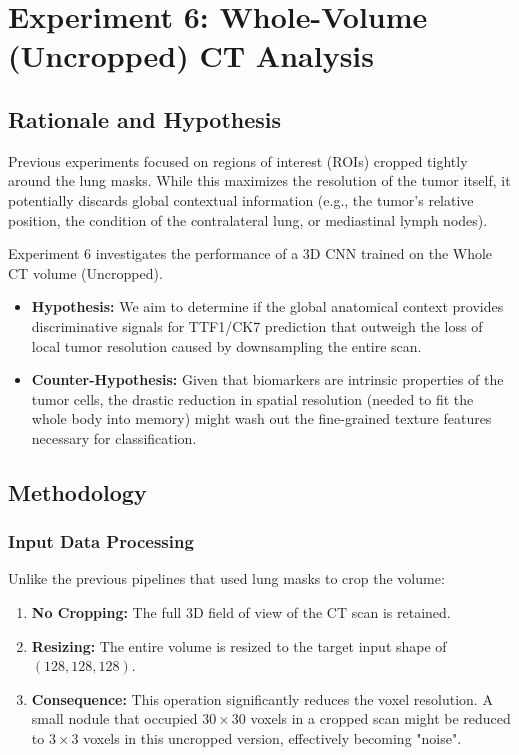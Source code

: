 \section{Experiment 6: Whole-Volume (Uncropped) CT Analysis}

\subsection{Rationale and Hypothesis}
Previous experiments focused on regions of interest (ROIs) cropped tightly around the lung masks. While this maximizes the resolution of the tumor itself, it potentially discards global contextual information (e.g., the tumor's relative position, the condition of the contralateral lung, or mediastinal lymph nodes).

Experiment 6 investigates the performance of a 3D CNN trained on the Whole CT volume (Uncropped). 
\begin{itemize}
    \item \textbf{Hypothesis:} We aim to determine if the global anatomical context provides discriminative signals for TTF1/CK7 prediction that outweigh the loss of local tumor resolution caused by downsampling the entire scan.
    \item \textbf{Counter-Hypothesis:} Given that biomarkers are intrinsic properties of the tumor cells, the drastic reduction in spatial resolution (needed to fit the whole body into memory) might wash out the fine-grained texture features necessary for classification.
\end{itemize}

\subsection{Methodology}

\subsubsection{Input Data Processing}
Unlike the previous pipelines that used lung masks to crop the volume:
\begin{enumerate}
    \item \textbf{No Cropping:} The full 3D field of view of the CT scan is retained.
    \item \textbf{Resizing:} The entire volume is resized to the target input shape of $(128, 128, 128)$. 
    \item \textbf{Consequence:} This operation significantly reduces the voxel resolution. A small nodule that occupied $30 \times 30$ voxels in a cropped scan might be reduced to $3 \times 3$ voxels in this uncropped version, effectively becoming "noise".
\end{enumerate}

